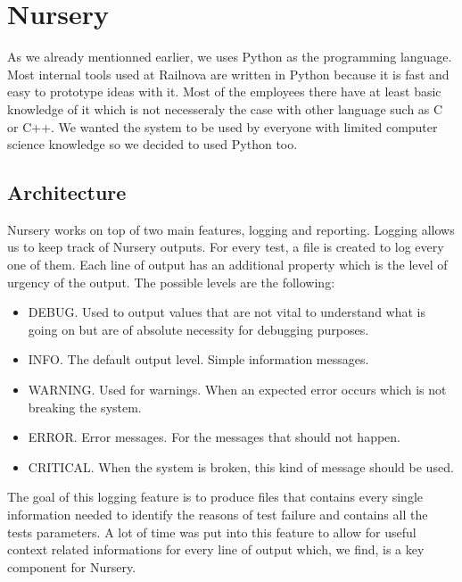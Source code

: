 \documentclass[12pt]{article}
\theoremstyle{definition}
\theoremstyle{definition}
\theoremstyle{remark}
\begin{document}

\section{Nursery}


As we already mentionned earlier, we uses Python as the programming language. Most internal tools used at Railnova are written in Python because it is fast and easy to prototype ideas with it. Most of the employees there have at least basic knowledge of it which is not necesseraly the case with other language such as C or C++. We wanted the system to be used by everyone with limited computer science knowledge so we decided to used Python too.


\subsection{Architecture}

Nursery works on top of two main features, logging and reporting. Logging allows us to keep track of Nursery outputs. For every test, a file is created to log every one of them. Each line of output has an additional property which is the level of urgency of the output. The possible levels are the following:

\begin{itemize}
\item DEBUG. Used to output values that are not vital to understand what is going on but are of absolute necessity for debugging purposes.
\item INFO. The default output level. Simple information messages.
\item WARNING. Used for warnings. When an expected error occurs which is not breaking the system.
\item ERROR. Error messages. For the messages that should not happen.
\item CRITICAL. When the system is broken, this kind of message should be used.
\end{itemize}

The goal of this logging feature is to produce files that contains every single information needed to identify the reasons of test failure and contains all the tests parameters. A lot of time was put into this feature to allow for useful context related informations for every line of output which, we find, is a key component for Nursery.\\
\end{document}
